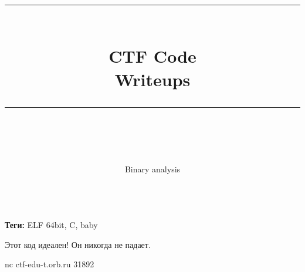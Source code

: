\documentclass[idxtotoc,hyperref,openany,oneside]{files/pwn} %
\newcommand{\HRule}{\rule{\linewidth}{0.5mm}} %
\begin{document}

\frontmatter %
\title{
\begin{center}
\HRule \\[0.4cm]
{\Huge \bfseries CTF Code \\[0.5cm] \Large Writeups}\\[0.4cm] %
\HRule \\[1.5cm]
\end{center}
}
\author{\Huge Binary analysis \\ \\[2cm]} %
\maketitle

\tableofcontents

\mainmatter %












\textbf{Теги:} ELF 64bit, C, baby\vspace{\baselineskip}

\begin{tcolorbox}
Этот код идеален! Он никогда не падает.

nc ctf-edu-t.orb.ru 31892
\end{tcolorbox}
\end{document}
